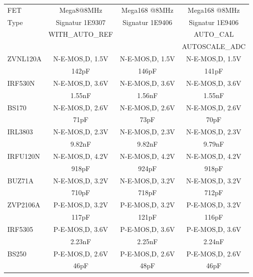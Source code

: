 \begin{table}[H]
  \begin{center}
    \begin{tabular}{| l | c | c | c |}
    \hline
     FET     & Mega8@8MHz       & Mega168 @8MHz    & Mega168 @8MHz \\
    Type     & Signatur 1E9307  & Signatur 1E9406  & Signatur 1E9406 \\
             & WITH\_AUTO\_REF  &                  & AUTO\_CAL \\
             &                  &                  & AUTOSCALE\_ADC \\
    \hline
    \hline
ZVNL120A     & N-E-MOS,D, 1.5V  & N-E-MOS,D, 1.5V  & N-E-MOS,D, 1.5V \\
             & 142pF            & 146pF            & 141pF \\
    \hline
IRF530N      & N-E-MOS,D, 3.6V  & N-E-MOS,D, 3.6V  & N-E-MOS,D, 3.6V \\
             & 1.55nF           & 1.56nF           & 1.55nF \\
    \hline
BS170        & N-E-MOS,D, 2.6V  & N-E-MOS,D, 2.6V  & N-E-MOS,D, 2.6V \\
             &  71pF            &  73pF            &  70pF \\
    \hline
IRL3803      & N-E-MOS,D, 2.3V  & N-E-MOS,D, 2.3V  & N-E-MOS,D, 2.3V \\
             & 9.82nF           & 9.82nF           & 9.79nF \\
    \hline
IRFU120N     & N-E-MOS,D, 4.2V  & N-E-MOS,D, 4.2V  & N-E-MOS,D, 4.2V \\
             & 918pF            & 924pF            & 918pF \\
    \hline
BUZ71A       & N-E-MOS,D, 3.2V  & N-E-MOS,D, 3.2V  & N-E-MOS,D, 3.2V \\
             & 710pF            & 718pF            & 712pF \\
    \hline
ZVP2106A     & P-E-MOS,D, 3.2V  & P-E-MOS,D, 3.2V  & P-E-MOS,D, 3.2V \\
             & 117pF            & 121pF            & 116pF \\
    \hline
IRF5305      & P-E-MOS,D, 3.6V  & P-E-MOS,D, 3.6V  & P-E-MOS,D, 3.6V \\
             & 2.23nF           & 2.25nF           & 2.24nF \\
    \hline
BS250        & P-E-MOS,D, 2.6V  & P-E-MOS,D, 2.6V  & P-E-MOS,D, 2.6V \\
             & 46pF             & 48pF             & 46pF \\

\end{tabular}
\end{center}
\end{table}
